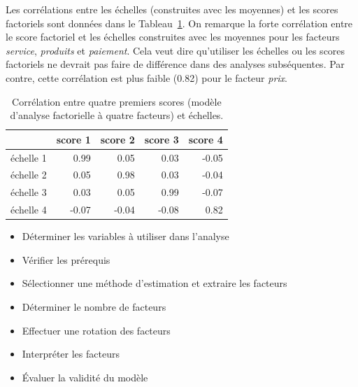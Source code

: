 \documentclass[
  11pt,
  letterpaper,
]{scrbook}
\providecommand{\tightlist}{%
  \setlength{\itemsep}{0pt}\setlength{\parskip}{0pt}}\usepackage{longtable,booktabs,array}
\theoremstyle{definition}
\theoremstyle{remark}
\begin{document}
Les corrélations entre les échelles (construites avec les moyennes) et
les scores factoriels sont données dans le
Tableau~\ref{tbl-corr-echelles-scores}. On remarque la forte corrélation
entre le score factoriel et les échelles construites avec les moyennes
pour les facteurs \emph{service}, \emph{produits} et \emph{paiement}.
Cela veut dire qu'utiliser les échelles ou les scores factoriels ne
devrait pas faire de différence dans des analyses subséquentes. Par
contre, cette corrélation est plus faible (0.82) pour le facteur
\emph{prix}.

\begin{longtable}[t]{lrrrr}

\caption{\label{tbl-corr-echelles-scores}Corrélation entre quatre
premiers scores (modèle d'analyse factorielle à quatre facteurs) et
échelles.}

\tabularnewline

\toprule
 & score 1 & score 2 & score 3 & score 4\\
\midrule
échelle 1 & 0.99 & 0.05 & 0.03 & -0.05\\
échelle 2 & 0.05 & 0.98 & 0.03 & -0.04\\
échelle 3 & 0.03 & 0.05 & 0.99 & -0.07\\
échelle 4 & -0.07 & -0.04 & -0.08 & 0.82\\
\bottomrule

\end{longtable}

\begin{tcolorbox}[enhanced jigsaw, coltitle=black, left=2mm, opacitybacktitle=0.6, colback=white, leftrule=.75mm, colframe=quarto-callout-tip-color-frame, toprule=.15mm, colbacktitle=quarto-callout-tip-color!10!white, opacityback=0, bottomtitle=1mm, toptitle=1mm, rightrule=.15mm, title=\textcolor{quarto-callout-tip-color}{\faLightbulb}\hspace{0.5em}{Étapes de l'analyse factorielle exploratoire}, breakable, titlerule=0mm, arc=.35mm, bottomrule=.15mm]

\begin{itemize}
\tightlist
\item
  Déterminer les variables à utiliser dans l'analyse
\item
  Vérifier les prérequis
\item
  Sélectionner une méthode d'estimation et extraire les facteurs
\item
  Déterminer le nombre de facteurs
\item
  Effectuer une rotation des facteurs
\item
  Interpréter les facteurs
\item
  Évaluer la validité du modèle
\end{itemize}

\end{tcolorbox}
\end{document}
